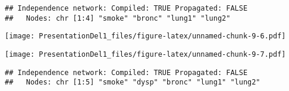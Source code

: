 \documentclass[
]{article}
\newenvironment{Shaded}{\begin{snugshade}}{\end{snugshade}}
\newcommand{\KeywordTok}[1]{\textcolor[rgb]{0.13,0.29,0.53}{\textbf{#1}}}
\newcommand{\NormalTok}[1]{#1}
\newcommand{\OperatorTok}[1]{\textcolor[rgb]{0.81,0.36,0.00}{\textbf{#1}}}
\newcommand{\StringTok}[1]{\textcolor[rgb]{0.31,0.60,0.02}{#1}}
\begin{document}
\begin{Shaded}
\end{Shaded}

\begin{verbatim}
## Independence network: Compiled: TRUE Propagated: FALSE 
##   Nodes: chr [1:4] "smoke" "bronc" "lung1" "lung2"
\end{verbatim}

\begin{Shaded}
\end{Shaded}

\texttt{[image: PresentationDel1\_files/figure-latex/unnamed-chunk-9-6.pdf]}

\begin{Shaded}
\end{Shaded}

\texttt{[image: PresentationDel1\_files/figure-latex/unnamed-chunk-9-7.pdf]}

\begin{Shaded}
\end{Shaded}

\begin{verbatim}
## Independence network: Compiled: TRUE Propagated: FALSE 
##   Nodes: chr [1:5] "smoke" "dysp" "bronc" "lung1" "lung2"
\end{verbatim}
\end{document}
